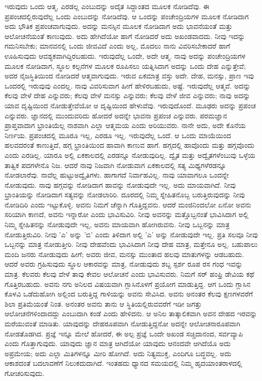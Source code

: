 ಇರುವುದು ಒಂದು ಆತ್ಮ, ಎರಡಲ್ಲ ಎಂಬುದನ್ನು ಅದೈತ ಸಿದ್ದಾಂತದ ಮೂಲಕ ನೋಡಿದೆವು. ಈ ಪ್ರಪಂಚದಲ್ಲಿರುವುದೆಲ್ಲ ಒಂದು ಎಂಬುದನ್ನು ನೋಡಿದೆವು. ಆ ಒಂದನ್ನು ಪಂಚೇಂದ್ರಿಯಗಳ ಮೂಲಕ ನೋಡಿದಾಗ ಅದು ಭೌತಿಕ ಪ್ರಪಂಚವಾಗುವುದು. ಅದನ್ನು ಮನಸ್ಸಿನ ಮೂಲಕ ನೋಡಿದಾಗ ಅದು ಭಾವನೆಯಂತೆ ಮತ್ತು ಆಲೋಚನೆಯಂತೆ ಕಾಣುವುದು. ಅದು ಹೇಗಿದೆಯೋ ಹಾಗೆ ನೋಡಿದರೆ ಅದು ಅಖಂಡವಾದದು. ನೀವು ಇದನ್ನು ಗಮನಿಸಬೇಕು; ಮಾನವನಲ್ಲಿ ಒಂದು ಜೀವವಿದೆ ಎಂದು ಅಲ್ಲ, ಮೊದಲು ನಾನು ವಿವರಿಸಬೇಕಾದರೆ ಹಾಗೆ ಊಹಿಸುವುದು ಆವಶ್ಯಕವಾಗಿದ್ದಿರಬಹುದು. ಇರುವುದೆಲ್ಲ ಒಂದೇ, ಅದೇ ಆತ್ಮ. ನಾವು ಅದನ್ನು ಪಂಚೇಂದ್ರಿಯಗಳ ಮೂಲಕ ನೋಡಿದಾಗ, ಸ್ಥೂಲ ಕಲ್ಪನೆಗಳ ಮೂಲಕ ರೂಪಿಸಲು ಯತ್ನಿಸಿದಾಗ ಅದನ್ನು ಒಂದು ದೇಹ ಎನ್ನುತ್ತೇವೆ; ಅದರ ನೈಜಸ್ಥಿತಿಯಿಂದ ನೋಡಿದರೆ ಆತ್ಮವಾಗುವುದು. ಇರುವ ಏಕಮಾತ್ರ ವಸ್ತು ಅದೇ. ದೇಹ, ಮನಸ್ಸು, ಪ್ರಾಣ ಇವು ಒಂದರಲ್ಲಿ ಇರುವುವು ಎಂದಲ್ಲ. ನಾವು ವಿವರಿಸುವಾಗ ಹೀಗೆ ಹೇಳಿರಬಹುದು, ಅಷ್ಟೆ. ಇರುವುದೆಲ್ಲ ಆತ್ಮವೆ. ಅದನ್ನು ಕೆಲವು ವೇಳೆ ದೇಹ ಎನ್ನುವರು; ಕೆಲವು ವೇಳೆ ಮನಸ್ಸು ಎನ್ನುವರು; ಕೆಲವು ವೇಳೆ ಜೀವ ಎನ್ನುವರು; ನಾವು ಅದನ್ನು ಯಾವ ದೃಷ್ಟಿಯಿಂದ ನೋಡುತ್ತೇವೆಯೋ ಆ ದೃಷ್ಟಿಯಿಂದ ಹೇಳುವೆವು. ಇರುವುದೊಂದೆ. ಮೂಢರು ಅದನ್ನು ಪ್ರಪಂಚ ಎನ್ನುವರು. ಜ್ಞಾನದಲ್ಲಿ ಮುಂದುವರಿದು ಹೋದರೆ ಅದನ್ನೇ ಭಾವನಾ ಪ್ರಪಂಚ ಎನ್ನುವರು. ಪರಮಜ್ಞಾನ ಪ್ರಾಪ್ತವಾದಾಗ ಭ್ರಾಂತಿಯೆಲ್ಲ ನಾಶವಾಗಿ ಎಲ್ಲಾ ಆತ್ಮಮಯ ಎಂದು ಅರಿಯುವರು. ನಾನೇ ಅದು, ಅದೇ ಕೊನೆಯ ನಿರ್ಣಯ. ಪ್ರಪಂಚದಲ್ಲಿ ಮೂರೂ ಇಲ್ಲ, ಎರಡೂ ಇಲ್ಲ. ಇರುವುದೆಲ್ಲ ಒಂದೆ. ಆ ಒಂದು ಮಾಯೆಯಿಂದ ಹಲವದರಂತೆ ಕಾಣುತ್ತಿದೆ, ಹಗ್ಗ ಭ್ರಾಂತಿಯಿಂದ ಹಾವಾಗಿ ಕಾಣುವ ಹಾಗೆ. ಹಗ್ಗದಲ್ಲಿ ಹಾವೊಂದು ಮತ್ತು ಹಗ್ಗವೊಂದು ಎಂದು ಎರಡಿಲ್ಲ. ಯಾರೂ ಅಲ್ಲಿ ಏಕಕಾಲದಲ್ಲಿ ಎರಡನ್ನೂ ನೋಡುವುದಿಲ್ಲ. ದ್ವೈತ ಮತ್ತು ಅದ್ವೈತಗಳೆಂಬುವು ಒಳ್ಳೆಯ ತಾತ್ವಿಕ ಪದಗಳೇನೊ ನಿಜ. ಆದರೆ ನಾವು ನಿಜವಾಗಿ ನೋಡುವಾಗ ಏಕಕಾಲದಲ್ಲಿ ಸತ್ಯ ಮಿಥ್ಯಗಳೆರಡನ್ನೂ ನೋಡಲಾರೆವು. ನಾವೆಲ್ಲ ಹುಟ್ಟು\break ಅದ್ವೈತಿಗಳು. ಹಾಗಾಗದೆ ನಿರ್ವಾಹವಿಲ್ಲ. ನಾವು ಯಾವಾಗಲೂ ಒಂದನ್ನೇ ನೋಡುವುದು. ನಾವು ಹಗ್ಗವನ್ನು ನೋಡಿದಾಗ ಹಾವನ್ನು ನೋಡುವುದೇ ಇಲ್ಲ. ಅದು ಮಾಯವಾಗಿದೆ. ನೀವು ಭ್ರಾಂತಿಯನ್ನು ನೋಡಿದಾಗ ಸತ್ಯವನ್ನು ನೋಡಲಾರಿರಿ. ದೂರದಲ್ಲಿ ನಿಮ್ಮ ಸ್ನೇಹಿತನೊಬ್ಬ ಬರುತ್ತಿರುವುದನ್ನು ನೀವು ನೋಡಿದಿರಿ ಎಂದು ಇಟ್ಟುಕೊಳ್ಳಿ. ಅವನು ನಿಮಗೆ ಚೆನ್ನಾಗಿ ಗೊತ್ತಿದ್ದವನು. ಆದರೆ ಮಂಜಿನಿಂದಲೋ ಏನೋ ಅವನು ಸರಿಯಾಗಿ ಕಾಣದೆ, ಅವನು ಇನ್ನಾರೋ ಎಂದು ಭಾವಿಸುವಿರಿ. ನೀವು ಅವನನ್ನು ಮತ್ತೊಬ್ಬನಂತೆ ಭಾವಿಸಿದಾಗ ಅಲ್ಲಿ ನಿಮ್ಮ ಸ್ನೇಹಿತನನ್ನು ನೋಡುವುದೇ ಇಲ್ಲ, ಅವನು ಮಾಯವಾಗಿ ಹೋಗಿರುವನು. ನೀವು ಒಬ್ಬನನ್ನು ಮಾತ್ರ ನೋಡುತ್ತಿರುವಿರಿ. ನೀವು 'ಎ' ಅನ್ನು 'ಬಿ' ಎಂದು ತಿಳಿದಾಗ ಅಲ್ಲಿ 'ಎ' ಅನ್ನು ನೋಡುವುದೇ ಇಲ್ಲ. ಪ್ರತಿ ಸಲವೂ ನೀವು ಒಬ್ಬನನ್ನು ಮಾತ್ರ ನೋಡುತ್ತೀರಿ. ನೀವು ದೇಹವೆಂದು ಭಾವಿಸಿದಾಗ ನೀವು ದೇಹ ಮಾತ್ರ, ಮತ್ತೇನೂ ಅಲ್ಲ. ಬಹುಪಾಲು ಮಂದಿ ಜನರು ನೋಡುವುದು ಹೀಗೆ; ಅವರು ಜೀವ, ಮನಸ್ಸು ಮುಂತಾದ ಹಲವು ಮಾತುಗಳನ್ನು ಆಡಬಹುದು. ಆದರೆ ಅವರು ಗ್ರಹಿಸುವುದು ಸ್ಥೂಲ ಆಕಾರವನ್ನು ಮಾತ್ರ, ನೋಡುವುದು ಶಬ್ದ ಸ್ಪರ್ಶ ರೂಪ ರಸ ಗಂಧ ಇವನ್ನು ಮಾತ್ರ. ಕೆಲವರು ಕೆಲವು ವೇಳೆ ತಾವು ಕೇವಲ ಆಲೋಚನೆ ಎಂದು ಭಾವಿಸುವರು. ನಿಮಗೆ ಸರ್ ಹಂಫ್ರಿ ಡೇವಿಯ ಕಥೆ ಗೊತ್ತಿರಬಹುದು. ಅವನು ನಗು ಅನಿಲದ ವಿಷಯವಾಗಿ ಗ್ಲಾಸಿನೊಳಗೆ ಪ್ರಯೋಗ ಮಾಡುತ್ತಿದ್ದ. ಆಗ ಒಂದು ಗ್ಲಾಸಿನ ಕೊಳವಿ ಒಡೆದುಹೋಗಿ ಅಲ್ಲಿಂದ ಬರುತ್ತಿದ್ದ ಗಾಳಿಯನ್ನು ಅವನು ಸೇವಿಸಿದ. ಅವನು ಅನಂತರ ಕೆಲವು ಕ್ಷಣಗಳವರೆಗೆ ಶಿಲಾ ಪ್ರತಿಮೆಯಂತೆ ನಿಂತ. ಅನಂತರ ಅವನು ತಾನು ಆ ಸ್ಥಿತಿಯಲ್ಲಿರುವವರೆಗೆ ಇಡೀ ಜಗತ್ತು ಆಲೋಚನೆಗಳಿಂದಾದದ್ದು ಎಂಬುದಾಗಿ ಕಂಡೆ ಎಂದು ಹೇಳಿದನು. ಆ ಅನಿಲ ತಾತ್ಕಾಲಿಕವಾಗಿ ಅವನ ದೇಹದ ಇರವನ್ನು ಮರೆಯುವಂತೆ ಮಾಡಿತು. ಯಾವುದನ್ನು ದೇಹರೂಪವಾಗಿ ನೋಡುತ್ತಿದ್ದನೋ ಅದನ್ನೇ ಆಲೋಚನಾರೂಪವಾಗಿ ನೋಡತೊಡಗಿದ. ಪ್ರಜ್ಞೆ ಇನ್ನೂ ಮೇಲೆ ಹೋದರೆ, ಈ ಅಲ್ಪ ಪ್ರಜ್ಞೆ ಒಂದೇ ಅಖಂಡ ಸಚ್ಚಿದಾನಂದ, ಸರ್ವವ್ಯಾಪಿ ಎಂದು ಗೊತ್ತಾಗುವುದು. ಯಾವುದು ಜ್ಞಾನ ಮಾತ್ರ ಆಗಿದೆಯೋ ಯಾವುದು ಆನಂದವೇ ಆಗಿದೆಯೊ ಅದು ಅಪ್ರಮೇಯ; ಅದು ಎಲ್ಲಾ ಮಿತಿಗಳನ್ನೂ ಮೀರಿ ಹೋಗಿದೆ. ಅದು ನಿತ್ಯಮುಕ್ತ, ಎಂದಿಗೂ ಬದ್ಧವಲ್ಲ. ಅದು ಆಕಾಶದಂತೆ ಬದಲಾವಣೆಗೆ ನಿಲುಕದುದಾಗಿದೆ. ಇಂತಹದು ಧ್ಯಾನದ ಸಮಯದಲ್ಲಿ ನಿಮ್ಮ ಹೃದಯಾಂತರಾಳದಲ್ಲಿ ಗೋಚರಿಸುವುದು.

